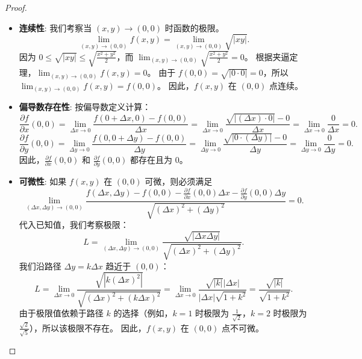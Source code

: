 \documentclass[lang=cn,10pt,thmcnt=section]{elegantbook}
\begin{document}
\begin{proof}
\begin{itemize}
    \item \textbf{连续性}:
    我们考察当 $(x, y) \to (0, 0)$ 时函数的极限。
    \[
    \lim_{(x,y) \to (0,0)} f(x, y) = \lim_{(x,y) \to (0,0)} \sqrt{|xy|}.
    \]
    因为 $0 \le \sqrt{|xy|} \le \sqrt{\frac{x^2+y^2}{2}}$，而 $\lim_{(x,y)\to(0,0)} \sqrt{\frac{x^2+y^2}{2}} = 0$。
    根据夹逼定理，$\lim_{(x,y) \to (0,0)} f(x, y) = 0$。
    由于 $f(0, 0) = \sqrt{|0 \cdot 0|} = 0$，所以 $\lim_{(x,y) \to (0,0)} f(x, y) = f(0, 0)$。
    因此，$f(x, y)$ 在 $(0, 0)$ 点连续。

    \item \textbf{偏导数存在性}:
    按偏导数定义计算：
    \[
    \frac{\partial f}{\partial x}(0, 0) = \lim_{\Delta x \to 0} \frac{f(0+\Delta x, 0) - f(0, 0)}{\Delta x} = \lim_{\Delta x \to 0} \frac{\sqrt{|(\Delta x) \cdot 0|} - 0}{\Delta x} = \lim_{\Delta x \to 0} \frac{0}{\Delta x} = 0.
    \]
    \[
    \frac{\partial f}{\partial y}(0, 0) = \lim_{\Delta y \to 0} \frac{f(0, 0+\Delta y) - f(0, 0)}{\Delta y} = \lim_{\Delta y \to 0} \frac{\sqrt{|0 \cdot (\Delta y)|} - 0}{\Delta y} = \lim_{\Delta y \to 0} \frac{0}{\Delta y} = 0.
    \]
    因此，$\frac{\partial f}{\partial x}(0, 0)$ 和 $\frac{\partial f}{\partial y}(0, 0)$ 都存在且为 $0$。

    \item \textbf{可微性}:
    如果 $f(x, y)$ 在 $(0, 0)$ 可微，则必须满足
    \[
    \lim_{(\Delta x, \Delta y) \to (0, 0)} \frac{f(\Delta x, \Delta y) - f(0, 0) - \frac{\partial f}{\partial x}(0, 0)\Delta x - \frac{\partial f}{\partial y}(0, 0)\Delta y}{\sqrt{(\Delta x)^2 + (\Delta y)^2}} = 0.
    \]
    代入已知值，我们考察极限：
    \[
    L = \lim_{(\Delta x, \Delta y) \to (0, 0)} \frac{\sqrt{|\Delta x \Delta y|}}{\sqrt{(\Delta x)^2 + (\Delta y)^2}}.
    \]
    我们沿路径 $\Delta y = k \Delta x$ 趋近于 $(0, 0)$：
    \[
    L = \lim_{\Delta x \to 0} \frac{\sqrt{|k(\Delta x)^2|}}{\sqrt{(\Delta x)^2 + (k\Delta x)^2}} = \lim_{\Delta x \to 0} \frac{\sqrt{|k|}|\Delta x|}{|\Delta x|\sqrt{1+k^2}} = \frac{\sqrt{|k|}}{\sqrt{1+k^2}}.
    \]
    由于极限值依赖于路径 $k$ 的选择（例如，$k=1$ 时极限为 $\frac{1}{\sqrt{2}}$，$k=2$ 时极限为 $\frac{\sqrt{2}}{\sqrt{5}}$），所以该极限不存在。
    因此，$f(x, y)$ 在 $(0, 0)$ 点不可微。
\end{itemize}
\end{proof}
\end{document}
